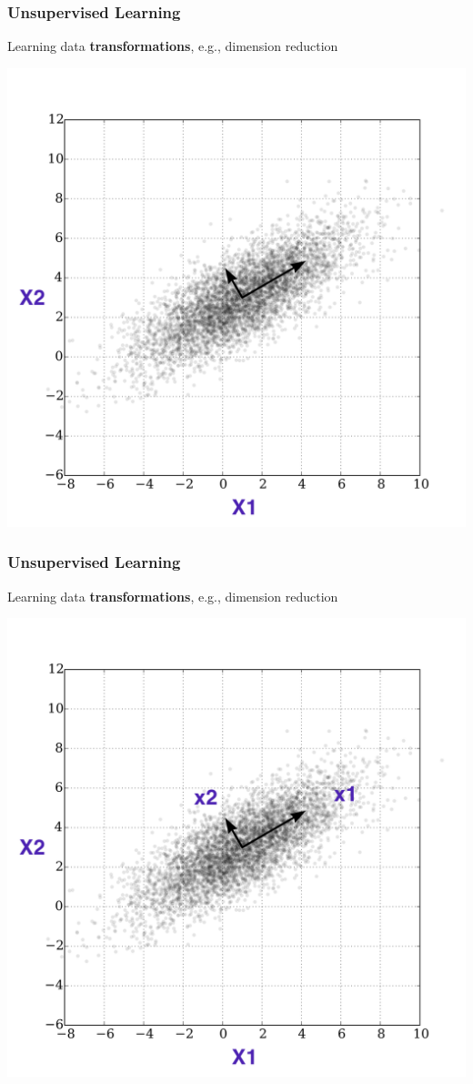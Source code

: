 \documentclass[t]{beamer}
\newcommand\df{\bf\color{Maroon}}
\begin{document}
\begin{frame}
  \frametitle{Unsupervised Learning}
  Learning data {\df transformations}, e.g., dimension reduction
   \begin{center}
    \includegraphics[scale=0.13]{PCA.png}
   \end{center}
\end{frame}

\begin{frame}
  \frametitle{Unsupervised Learning}
  Learning data {\df transformations}, e.g., dimension reduction
   \begin{center}
    \includegraphics[scale=0.13]{PCA2.png}
   \end{center}
\end{frame}
\end{document}
